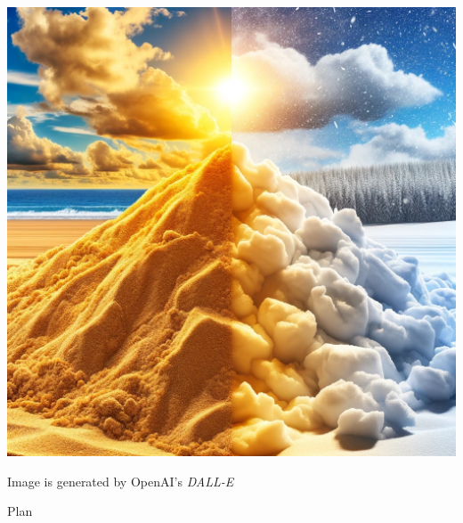 \documentclass[9pt,table,xcolor=dvipsnames]{beamer}
\begin{document}
\begin{frame}[fragile,t] %
  \begin{center}
    \includegraphics[scale=0.20]{./figs/Contrasting_Sand_and_Snow_Pile.png}
    \bigskip

    \small Image is generated by OpenAI's \textit{DALL-E} 

  \end{center}
\end{frame}
\begin{frame}{Plan} %
 \tableofcontents
\end{frame}
\end{document}
